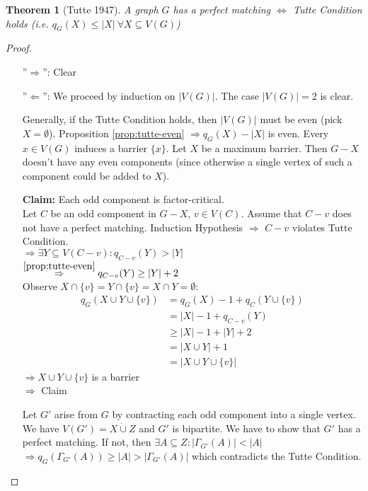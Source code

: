 \documentclass[11pt, a4paper]{article}
\newcommand{\abs}[1]{\left\lvert#1\right\rvert}
\newtheorem{theorem}{Theorem}[section]
\theoremstyle{remark}
\theoremstyle{definition}
\begin{document}
\begin{theorem}[Tutte 1947]
	A graph $G$ has a perfect matching $\Leftrightarrow$ Tutte Condition
	holds (i.e. $q_G(X)\leq\abs{X}\ \forall X\subseteq V(G)$)
\end{theorem}
\begin{proof}\ 
\begin{enumerate}
	\item[''$\Rightarrow$'':] Clear
	\item[''$\Leftarrow$'':] We proceed by induction on $\abs{V(G)}$.
	The case $\abs{V(G)}=2$ is clear.
	
	Generally, if the Tutte Condition holds, then $\abs{V(G)}$ must be
	even (pick $X=\emptyset$).
	Proposition \ref{prop:tutte-even} $\Rightarrow q_G(X)-\abs{X}$ is even.
	Every $x\in V(G)$ induces a barrier $\{x\}$. Let $X$ be a maximum
	barrier. Then $G-X$ doesn't have any even components (since otherwise
	a single vertex of such a component could be added to $X$).
	
	\textbf{Claim:} Each odd component is factor-critical. \\
	Let $C$ be an odd component in $G-X$, $v\in V(C)$. Assume that $C-v$
	does not have a perfect matching. Induction Hypothesis $\Rightarrow$
	$C-v$ violates Tutte Condition. \\
	$\Rightarrow \exists Y\subseteq V(C-v): q_{C-v}(Y)>\abs{Y}$ \\
	$\stackrel{\ref{prop:tutte-even}}{\Rightarrow} q_{C-v}(Y)\geq \abs{Y}+2$ \\
	Observe $X\cap\{v\}=Y\cap\{v\}=X\cap Y=\emptyset$:
	\begin{align*}
	q_G(X\cup Y\cup\{v\})&=q_G(X)-1+q_C(Y\cup\{v\}) \\
	&=\abs{X}-1+q_{C-v}(Y) \\
	&\geq\abs{X}-1+\abs{Y}+2 \\
	&=\abs{X\cup Y}+1 \\
	&=\abs{X\cup Y\cup\{v\}}
	\end{align*}
	$\Rightarrow X\cup Y\cup\{v\}$ is a barrier \\
	$\Rightarrow$ Claim
	
	Let $G'$ arise from $G$ by contracting each odd component into a
	single vertex. We have $V(G')=X\dot\cup Z$ and $G'$ is bipartite.
	We have to show that $G'$ has a perfect matching. If not, then
	$\exists A\subseteq Z: \abs{\Gamma_{G'}(A)}<\abs{A}$ \\
	$\Rightarrow q_G(\Gamma_{G'}(A))\geq \abs{A}>\abs{\Gamma_{G'}(A)}$
	which contradicts the Tutte Condition.
\end{enumerate}
\end{proof}
\end{document}
